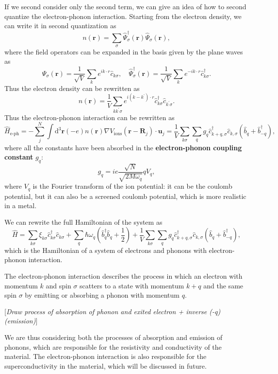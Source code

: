 If we second consider only the second term, we can give an idea of how to second quantize the electron-phonon interaction. Starting from the electron density, we can write it in second quantization as
\[
    n(\mathbf{r}) = \sum_{\sigma} \hat{\Psi}_{\sigma}^{\dagger}(\mathbf{r}) \hat{\Psi}_{\sigma}(\mathbf{r}),
\]
where the field operators can be expanded in the basis given by the plane waves as
\[
    \hat{\Psi}_{\sigma}(\mathbf{r}) = \frac{1}{\sqrt{V}} \sum_{k} e^{i k \cdot r} \hat{c}_{k \sigma}, \quad \hat{\Psi}_{\sigma}^{\dagger}(\mathbf{r}) = \frac{1}{\sqrt{V}} \sum_{k} e^{-i k \cdot r} \hat{c}_{k \sigma}^{\dagger}.
\]
Thus the electron density can be rewritten as
\[
    n(\mathbf{r}) = \frac{1}{V} \sum_{k k^{\prime} \sigma} e^{i (k - k^{\prime}) \cdot r} \hat{c}_{k \sigma}^{\dagger} \hat{c}_{k^{\prime} \sigma}.
\]
Thus the electron-phonon interaction can be rewritten as
\[
    \hat{H}_{\text{e-ph}} = - \sum_{j}^N \int \mathrm{d}^3 \mathbf{r} (-e) n(\mathbf{r}) \nabla V_{\text{ions}}(\mathbf{r} - \mathbf{R}_j) \cdot \mathbf{u}_j = \frac{1}{V} \sum_{k \sigma} \sum_{q} g_q \hat{c}_{k+q, \sigma}^{\dagger} \hat{c}_{k, \sigma} (\hat{b}_q + \hat{b}_{-q}^{\dagger}),
\]
where all the constants have been absorbed in the \textbf{electron-phonon coupling constant} \(g_q\):
\[
    g_q = i e \frac{\sqrt{N}}{\sqrt{2 M \omega_q}} q V_q,
\]
where \(V_q\) is the Fourier transform of the ion potential: it can be the coulomb potential, but it can also be a screened coulomb potential, which is more realistic in a metal.

We can rewrite the full Hamiltonian of the system as
\[
    \hat{H} = \sum_{k \sigma} \xi_{k \sigma} \hat{c}_{k \sigma}^{\dagger} \hat{c}_{k \sigma} + \sum_{q} \hbar \omega_q \left( \hat{b}_q^{\dagger} \hat{b}_q + \frac{1}{2} \right) + \frac{1}{V} \sum_{k \sigma} \sum_{q} g_q \hat{c}_{k+q, \sigma}^{\dagger} \hat{c}_{k, \sigma} (\hat{b}_q + \hat{b}_{-q}^{\dagger}),
\]
which is the Hamiltonian of a system of electrons and phonons with electron-phonon interaction.

The electron-phonon interaction describes the process in which an electron with momentum \(k\) and spin \(\sigma\) scatters to a state with momentum \(k + q\) and the same spin \(\sigma\) by emitting or absorbing a phonon with momentum \(q\).

    [\textit{Draw process of absorption of phonon and exited electron + inverse (-q) (emission)}]

We are thus considering both the processes of absorption and emission of phonons, which are responsible for the resistivity and conductivity of the material. The electron-phonon interaction is also responsible for the superconductivity in the material, which will be discussed in future.

